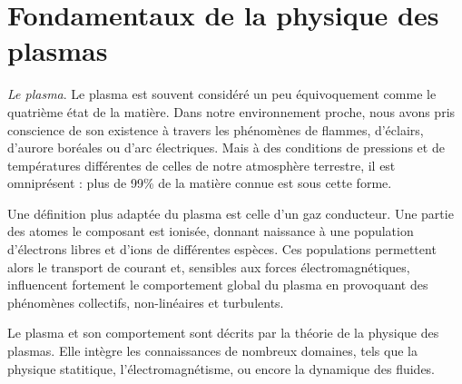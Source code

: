 \label{Introduction}
\section{Fondamentaux de la physique des plasmas}

\emph{Le plasma}. Le plasma est souvent considéré un peu équivoquement comme le
quatrième état de la matière. Dans notre environnement proche, nous avons pris
conscience de son existence à travers les phénomènes de flammes, d'éclairs,
d'aurore boréales ou d'arc électriques. Mais à des conditions de pressions et de
températures différentes de celles de notre atmosphère terrestre, il est
omniprésent : plus de 99\% de la matière connue est sous cette forme.

Une définition plus adaptée du plasma est celle d'un gaz conducteur. Une partie
des atomes le composant est ionisée, donnant naissance à une population
d'électrons libres et d'ions de différentes espèces. Ces populations permettent
alors le transport de courant et, sensibles aux forces électromagnétiques,
influencent fortement le comportement global du plasma en provoquant des
phénomènes collectifs, non-linéaires et turbulents.

Le plasma et son comportement sont décrits par la théorie de la physique des
plasmas. Elle intègre les connaissances de nombreux domaines, tels que la
physique statitique, l'électromagnétisme, ou encore la dynamique des fluides.


